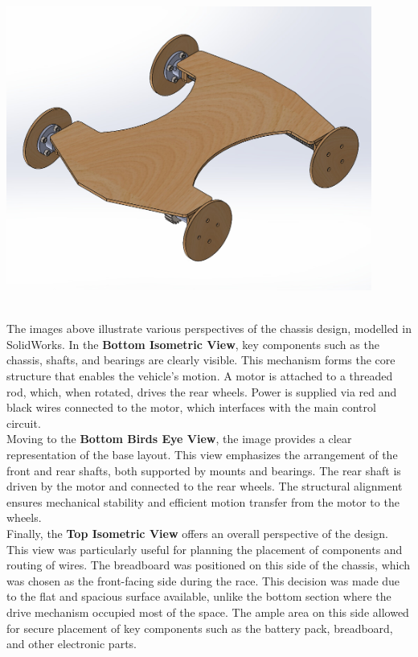 \documentclass{article}
\begin{document}
\begin{minipage}{0.3\textwidth}
	\centering
	\includegraphics[width=0.9\textwidth]{extracted_images2/image(4).png}
\end{minipage}\\[1em]
The images above illustrate various perspectives of the chassis design, modelled in SolidWorks. In the \textbf{Bottom Isometric View}, key components such as the chassis, shafts, and bearings are clearly visible. This mechanism forms the core structure that enables the vehicle's motion. A motor is attached to a threaded rod, which, when rotated, drives the rear wheels. Power is supplied via red and black wires connected to the motor, which interfaces with the main control circuit.\\[8pt]
Moving to the \textbf{Bottom Birds Eye View}, the image provides a clear representation of the base layout. This view emphasizes the arrangement of the front and rear shafts, both supported by mounts and bearings. The rear shaft is driven by the motor and connected to the rear wheels. The structural alignment ensures mechanical stability and efficient motion transfer from the motor to the wheels.\\[8pt]
Finally, the \textbf{Top Isometric View} offers an overall perspective of the design. This view was particularly useful for planning the placement of components and routing of wires. The breadboard was positioned on this side of the chassis, which was chosen as the front-facing side during the race. This decision was made due to the flat and spacious surface available, unlike the bottom section where the drive mechanism occupied most of the space. The ample area on this side allowed for secure placement of key components such as the battery pack, breadboard, and other electronic parts.
\end{document}
